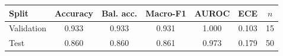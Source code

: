 \label{tab:semantic_classifier_performance}
\begin{tabularx}{\linewidth}{@{}Y*{6}{C}@{}}
\toprule
\textbf{Split} & \textbf{Accuracy} & \textbf{Bal. acc.} & \textbf{Macro-F1} & \textbf{AUROC} & \textbf{ECE} & \textbf{$n$}\\
\midrule
Validation & 0.933 & 0.933 & 0.931 & 1.000 & 0.103 & 15\\
Test & 0.860 & 0.860 & 0.861 & 0.973 & 0.179 & 50\\
\bottomrule
\end{tabularx}
